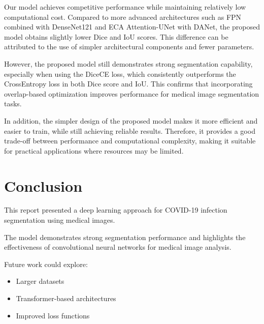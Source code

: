 \documentclass[10pt,twocolumn]{article}
\begin{document}
Our model achieves competitive performance while maintaining relatively low computational cost. Compared to more advanced architectures such as FPN combined with DenseNet121 and ECA Attention-UNet with DANet, the proposed model obtains slightly lower Dice and IoU scores. This difference can be attributed to the use of simpler architectural components and fewer parameters.

However, the proposed model still demonstrates strong segmentation capability, especially when using the DiceCE loss, which consistently outperforms the CrossEntropy loss in both Dice score and IoU. This confirms that incorporating overlap-based optimization improves performance for medical image segmentation tasks.

In addition, the simpler design of the proposed model makes it more efficient and easier to train, while still achieving reliable results. Therefore, it provides a good trade-off between performance and computational complexity, making it suitable for practical applications where resources may be limited.

\section{Conclusion}

This report presented a deep learning approach for COVID-19 infection segmentation using 
medical images.

The model demonstrates strong segmentation performance and highlights the effectiveness 
of convolutional neural networks for medical image analysis.

Future work could explore:

\begin{itemize}
\item Larger datasets
\item Transformer-based architectures
\item Improved loss functions
\end{itemize}
\end{document}
